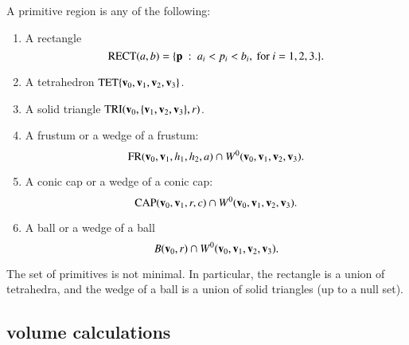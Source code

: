 \begin{definition}[primitive]\label{def:primitive} 
A primitive region is any of the following:

\begin{enumerate}%
\item A rectangle 
\[ 
{\operatorname{RECT}}(a,b)=\{{\mathbf p} \ :\  a_i < p_i < b_i,\text { for } i=1,2,3.\}.
\] 
\item A tetrahedron ${\operatorname{TET}}\{{\mathbf v}_0,{\mathbf v}_1,{\mathbf v}_2,{\mathbf v}_3\}$.
\item A solid triangle ${\operatorname{TRI}}({\mathbf v}_0,\{{\mathbf v}_1,{\mathbf v}_2,{\mathbf v}_3\},r)$.
%
\item A frustum or a wedge of a frustum:
\[ 
{\operatorname{FR}}({\mathbf v}_0,{\mathbf v}_1,h_1,h_2,a) \cap W^0({\mathbf v}_0,{\mathbf v}_1,{\mathbf v}_2,{\mathbf v}_3).
\] 
\item A conic cap or a wedge of a conic cap: 
\[ 
{\operatorname{CAP}}({\mathbf v}_0,{\mathbf v}_1,r,c) \cap W^0({\mathbf v}_0,{\mathbf v}_1,{\mathbf v}_2,{\mathbf v}_3).
\] 
\item A ball or a wedge of a ball
\[ 
B({\mathbf v}_0,r) \cap W^0({\mathbf v}_0,{\mathbf v}_1,{\mathbf v}_2,{\mathbf v}_3).
\] 
%
%
%
%
%
%
%
\label{enum:volume-prim}
\end{enumerate}
The set of primitives is not minimal.  In particular, the
rectangle is a union of tetrahedra, and the wedge of a ball is a union of
solid triangles (up to a null set).

\end{definition}

\subsection{volume calculations}\label{sec:primitive}

